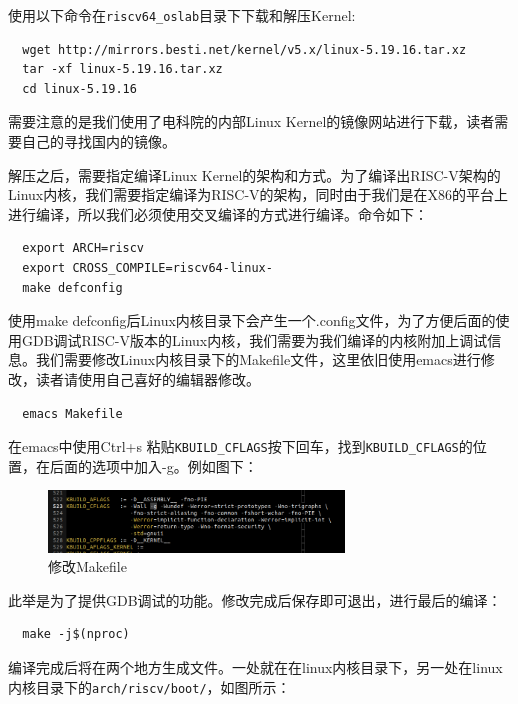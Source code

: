 \documentclass[lang=cn,10pt]{elegantbook}
\begin{document}
使用以下命令在\lstinline{riscv64_oslab}目录下下载和解压Kernel:

\begin{lstlisting}
  wget http://mirrors.besti.net/kernel/v5.x/linux-5.19.16.tar.xz
  tar -xf linux-5.19.16.tar.xz
  cd linux-5.19.16  
\end{lstlisting}

需要注意的是我们使用了电科院的内部Linux Kernel的镜像网站进行下载，读者需要自己的寻找国内的镜像。

解压之后，需要指定编译Linux Kernel的架构和方式。为了编译出RISC-V架构的Linux内核，我们需要指定编译为RISC-V的架构，同时由于我们是在X86的平台上进行编译，所以我们必须使用交叉编译的方式进行编译。命令如下：

\begin{lstlisting}
  export ARCH=riscv
  export CROSS_COMPILE=riscv64-linux-
  make defconfig  
\end{lstlisting}

使用make defconfig后Linux内核目录下会产生一个.config文件，为了方便后面的使用GDB调试RISC-V版本的Linux内核，我们需要为我们编译的内核附加上调试信息。我们需要修改Linux内核目录下的Makefile文件，这里依旧使用emacs进行修改，读者请使用自己喜好的编辑器修改。

\begin{lstlisting}
  emacs Makefile
\end{lstlisting}

在emacs中使用Ctrl+s 粘贴\lstinline{KBUILD_CFLAGS}按下回车，找到\lstinline{KBUILD_CFLAGS}的位置，在后面的选项中加入-g。例如图下：

\begin{figure}[htbp]
  \centering
  \includegraphics[width=0.7\textwidth]{image/image-20231105100304040.png}
  \caption{修改Makefile}
\end{figure}


此举是为了提供GDB调试的功能。修改完成后保存即可退出，进行最后的编译：

\begin{lstlisting}
  make -j$(nproc)	
\end{lstlisting}

\newpage
编译完成后将在两个地方生成文件。一处就在在linux内核目录下，另一处在linux内核目录下的\lstinline{arch/riscv/boot/}，如图所示：
\end{document}
